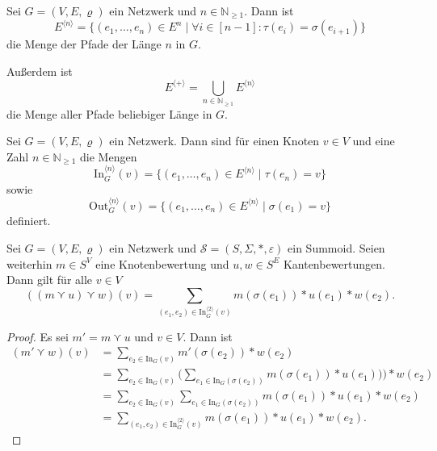 \documentclass{article}
\begin{document}
\begin{definition}
  Sei $G = (V, E, \varrho)$ ein Netzwerk und $n \in \mathbb{N}_{\geq 1}$.
  Dann ist
  \begin{equation*}
    E^{\langle n \rangle} = \{(e_1, \dots, e_n) \in E^n \mid \forall i \in [n - 1] \colon \tau(e_i) = \sigma(e_{i+1})\}
  \end{equation*}
  die Menge der Pfade der Länge $n$ in $G$.

  Außerdem ist
  \begin{equation*}
    E^{\langle + \rangle} = \bigcup_{n \in \mathbb{N}_{\geq 1}}E^{\langle n \rangle}
  \end{equation*}
  die Menge aller Pfade beliebiger Länge in $G$.
\end{definition}

\begin{definition}
  Sei $G = (V, E, \varrho)$ ein Netzwerk.
  Dann sind für einen Knoten $v \in V$ und eine Zahl $n \in \mathbb{N}_{\geq 1}$ die Mengen
  \begin{equation*}
    \text{In}^{\langle n \rangle}_G(v) = \{(e_1, \dots, e_n) \in E^{\langle n \rangle} \mid \tau(e_n) = v\}
  \end{equation*}
  sowie
  \begin{equation*}
    \text{Out}^{\langle n \rangle}_G(v) = \{(e_1, \dots, e_n) \in E^{\langle n \rangle} \mid \sigma(e_1) = v\}
  \end{equation*}
  definiert.
\end{definition}

\begin{theorem}\label{Theorem_PreMasterformel}
  Sei $G = (V, E, \varrho)$ ein Netzwerk und 
  $\mathcal{S} = (S, \Sigma, \ast, \varepsilon)$ ein Summoid.
  Seien weiterhin $m \in S^V$ eine Knotenbewertung und $u, w \in S^E$ Kantenbewertungen.
  Dann gilt für alle $v \in V$
  \begin{equation*}
    ((m \curlyvee u) \curlyvee w)(v) = \sum_{(e_1, e_2) \in \text{In}_G^{\langle 2 \rangle}(v)} m(\sigma(e_1)) \ast u(e_1) \ast w(e_2).
  \end{equation*}
\end{theorem}
\begin{proof}
  Es sei $m' = m \curlyvee u$ und $v \in V$. Dann ist
  \begin{align*}
    (m' \curlyvee w)(v)
    &= \sum_{e_2 \in \text{In}_G(v)} m' (\sigma(e_2)) \ast w(e_2) \\
    &= \sum_{e_2 \in \text{In}_G(v)} \bigg(\sum_{e_1 \in \text{In}_G(\sigma(e_2))}m(\sigma(e_1)) \ast u(e_1)) \bigg) \ast w(e_2) \\
    &= \sum_{e_2 \in \text{In}_G(v)} \sum_{e_1 \in \text{In}_G(\sigma(e_2))}m(\sigma(e_1)) \ast u(e_1) \ast w(e_2) \\
    &= \sum_{(e_1, e_2) \in \text{In}_G^{\langle 2 \rangle}(v)}m(\sigma(e_1)) \ast u(e_1) \ast w(e_2).
  \end{align*}
\end{proof}
\end{document}
